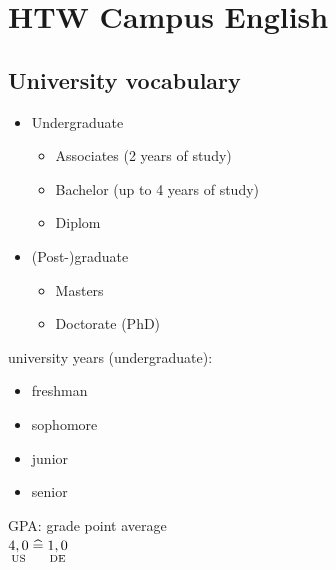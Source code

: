 







\maketitle
\newpage
\tableofcontents
\newpage


\section{HTW Campus English}

\subsection*{University vocabulary}
\begin{itemize}
\item Undergraduate
\begin{itemize}[label=$\rightarrow$]
\item Associates (2 years of study)
\item Bachelor (up to 4 years of study)
\item Diplom
\end{itemize}
\item (Post-)graduate
\begin{itemize}[label=$\rightarrow$]
\item Masters
\item Doctorate (PhD)
\end{itemize}
\end{itemize}
university years (undergraduate):
\begin{itemize}
\item freshman
\item sophomore
\item junior
\item senior
\end{itemize}
GPA: grade point average\\
$\underset{\text{US}}{4,0}\;\widehat{=}\; \underset{\text{DE}}{1,0} $
